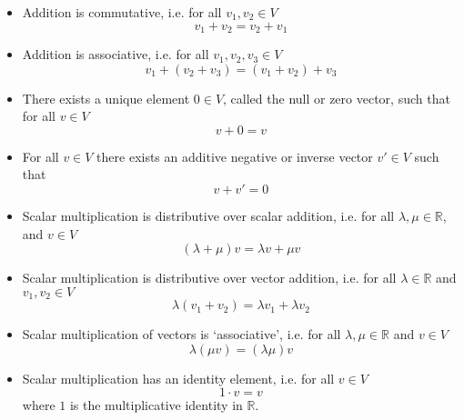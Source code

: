 \documentclass[12pt]{article}
\begin{document}
\begin{itemize}
    \item Addition is commutative, i.e. for all $v_{1}, v_{2} \in V$
    \begin{equation}
        v_{1} + v_{2} = v_{2} + v_{1}
    \end{equation}
    \item Addition is associative, i.e. for all $v_{1}, v_{2}, v_{3} \in V$
    \begin{equation}
        v_{1} + (v_{2} + v_{3}) = (v_{1} + v_{2}) + v_{3}
    \end{equation}
    \item There exists a unique element $0 \in V$, called the null or zero vector, such that for all $v\in V$
    \begin{equation}
        v + 0 = v
    \end{equation}
    \item For all $v\in V$ there exists an additive negative or inverse vector $v'\in V$ such that
    \begin{equation}
        v + v' = 0 
    \end{equation}
    \item Scalar multiplication is distributive over scalar addition, i.e. for all $\lambda, \mu \in \mathbb{R}$, and $v\in V$
    \begin{equation}
        (\lambda + \mu)v = \lambda v + \mu v
    \end{equation}
    \item Scalar multiplication is distributive over vector addition, i.e. for all $\lambda\in\mathbb{R}$ and $v_{1}, v_{2}\in V$
    \begin{equation}
        \lambda(v_{1}+v_{2}) = \lambda v_{1} + \lambda v_{2}
    \end{equation}
    \item Scalar multiplication of vectors is `associative', i.e. for all $\lambda, \mu \in \mathbb{R}$ and $v\in V$
    \begin{equation}
        \lambda(\mu v) = (\lambda\mu)v
    \end{equation}
    \item Scalar multiplication has an identity element, i.e. for all $v\in V$
    \begin{equation}
        1\cdot v = v
    \end{equation}
    where $1$ is the multiplicative identity in $\mathbb{R}$.
\end{itemize}
\end{document}
